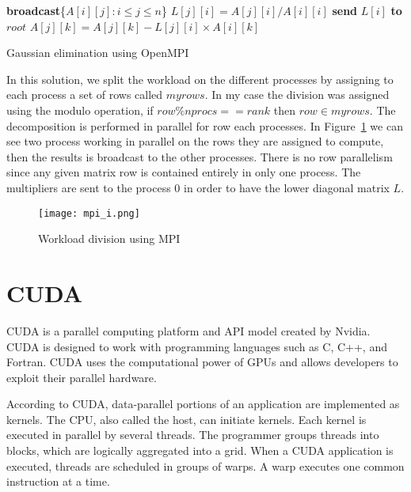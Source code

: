 \begin{algorithm}[H]
\begin{algorithmic}
	\State \textbf{broadcast}\{$A[i][j] : i \leq j \leq n $\}
		\State $L[j][i] = A[j][i] / A[i][i]$ 
	\EndFor
	\State \textbf{send} $L[i]$ \textbf{to} $root$ 
			\State $A[j][k] = A[j][k] - L[j][i] \times A[i][k]$ 
		\EndFor	
	\EndFor
\EndFor
\end{algorithmic}
\caption{Gaussian elimination using OpenMPI}
\label{alg:mpi_code}
\end{algorithm}

In this solution, we split the workload on the different processes by assigning to each process a set of rows called $myrows$. In my case the division was assigned using the modulo operation, if $row \% nprocs == rank$ then $row \in myrows$. 
The decomposition is performed in parallel for row each processes. In Figure~\ref{img:mpi_workload} we can see two process working in parallel on the rows they are assigned to compute, then the results is broadcast to the other processes. There is no row parallelism since any given matrix row is contained entirely in only one process. The multipliers are sent to the process 0 in order to have the lower diagonal matrix $L$.


\begin{figure}[H]
\centering
\texttt{[image: mpi\_i.png]}
\caption{Workload division using MPI}
\label{img:mpi_workload}
\end{figure}



\section{CUDA}
CUDA is a parallel computing platform and API model created by Nvidia. CUDA  is designed to work with programming languages such as C, C++, and Fortran.  CUDA uses the computational power of GPUs and allows developers to exploit their parallel hardware. 

According to CUDA, data-parallel portions of an application
are implemented as kernels. The CPU, also called the host, can
initiate kernels. Each kernel is executed in parallel by
several threads. The programmer groups threads into blocks, which
are logically aggregated into a grid. When a CUDA application is
executed, threads are scheduled in groups of warps. A warp executes
one common instruction at a time.


